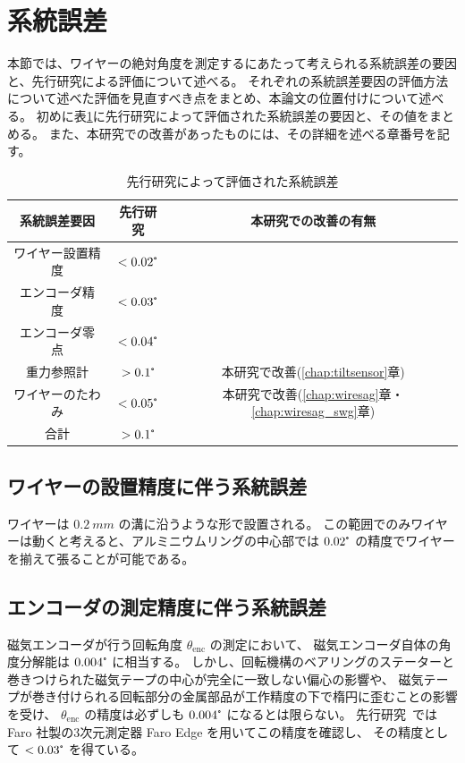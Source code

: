 \documentclass[../../main.tex]{subfiles}
\begin{document}
\section{系統誤差}
本節では、ワイヤーの絶対角度を測定するにあたって考えられる系統誤差の要因と、先行研究による評価について述べる。
それぞれの系統誤差要因の評価方法について述べた評価を見直すべき点をまとめ、本論文の位置付けについて述べる。
初めに表\ref{tab:systematic_errors_old}に先行研究によって評価された系統誤差の要因と、その値をまとめる。
また、本研究での改善があったものには、その詳細を述べる章番号を記す。
\begin{table}[H]
    \centering
    \caption{先行研究によって評価された系統誤差}
    \begin{tabular}{ccc}
        \hline
        \hline
        系統誤差要因 & 先行研究 & 本研究での改善の有無\\
        \hline
        ワイヤー設置精度 & $< 0.02\tcdegree$ \\
        エンコーダ精度 & $<0.03\tcdegree$ \\
        エンコーダ零点 & $<0.04\tcdegree$ \\
        重力参照計 & $>0.1\tcdegree$ & 本研究で改善(\ref{chap:tiltsensor}章) \\
        ワイヤーのたわみ & $<0.05\tcdegree$ & 本研究で改善(\ref{chap:wiresag}章・\ref{chap:wiresag_swg}章) \\
        \hline
        合計 & $>0.1\tcdegree$ \\
        \hline
        \hline
    \end{tabular}
    \label{tab:systematic_errors_old}
\end{table}
\subsection{ワイヤーの設置精度に伴う系統誤差}
ワイヤーは $\SI{0.2}{mm}$ の溝に沿うような形で設置される。
この範囲でのみワイヤーは動くと考えると、アルミニウムリングの中心部では $0.02\tcdegree$ の精度でワイヤーを揃えて張ることが可能である。
\subsection{エンコーダの測定精度に伴う系統誤差}
磁気エンコーダが行う回転角度 $\theta_{\mathrm{enc}}$ の測定において、
磁気エンコーダ自体の角度分解能は $0.004\tcdegree$ に相当する。
しかし、回転機構のベアリングのステーターと巻きつけられた磁気テープの中心が完全に一致しない偏心の影響や、
磁気テープが巻き付けられる回転部分の金属部品が工作精度の下で楕円に歪むことの影響を受け、
$\theta_{\mathrm{enc}}$ の精度は必ずしも $0.004\tcdegree$ になるとは限らない。
先行研究~\cite{swg:iijima}では Faro 社製の3次元測定器 Faro Edge を用いてこの精度を確認し、
その精度として $< 0.03\tcdegree$ を得ている。
\end{document}
